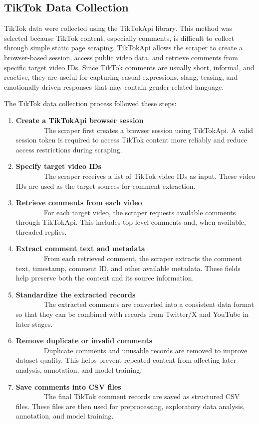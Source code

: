 \documentclass[12pt,oneside,openright,a4paper]{cpe-english-project}
\begin{document}
\subsection{TikTok Data Collection}

TikTok data were collected using the TikTokApi library. This method was selected because TikTok content, especially comments, is difficult to collect through simple static page scraping. TikTokApi allows the scraper to create a browser-based session, access public video data, and retrieve comments from specific target video IDs. Since TikTok comments are usually short, informal, and reactive, they are useful for capturing casual expressions, slang, teasing, and emotionally driven responses that may contain gender-related language.

The TikTok data collection process followed these steps:

\begin{enumerate}
\item
  {\textbf{Create a TikTokApi browser session}\\
  ~~~~~~~~The scraper first creates a browser session using TikTokApi. A valid session token is required to access TikTok content more reliably and reduce access restrictions during scraping.}
\item
  {\textbf{Specify target video IDs}\\
  ~~~~~~~~The scraper receives a list of TikTok video IDs as input. These video IDs are used as the target sources for comment extraction.}
\item
  {\textbf{Retrieve comments from each video}\\
  ~~~~~~~~For each target video, the scraper requests available comments through TikTokApi. This includes top-level comments and, when available, threaded replies.}
\item
  {\textbf{Extract comment text and metadata}\\
  ~~~~~~~~From each retrieved comment, the scraper extracts the comment text, timestamp, comment ID, and other available metadata. These fields help preserve both the content and its source information.}
\item
  {\textbf{Standardize the extracted records}\\
  ~~~~~~~~The extracted comments are converted into a consistent data format so that they can be combined with records from Twitter/X and YouTube in later stages.}
\item
  {\textbf{Remove duplicate or invalid comments}\\
  ~~~~~~~~Duplicate comments and unusable records are removed to improve dataset quality. This helps prevent repeated content from affecting later analysis, annotation, and model training.}
\item
  {\textbf{Save comments into CSV files}\\
  ~~~~~~~~The final TikTok comment records are saved as structured CSV files. These files are then used for preprocessing, exploratory data analysis, annotation, and model training.}
\end{enumerate}
\end{document}
